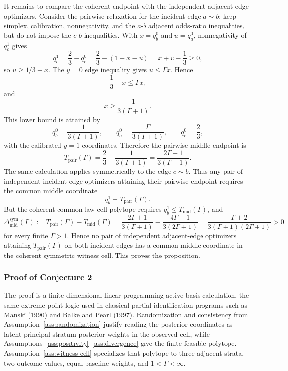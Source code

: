 \documentclass[11pt]{article}
\theoremstyle{definition}
\theoremstyle{plain}
\theoremstyle{remark}
\begin{document}
It remains to compare the coherent endpoint with the independent adjacent-edge optimizers.  Consider the pairwise relaxation for the incident edge \(a\sim b\): keep simplex, calibration, nonnegativity, and the \(a\)-\(b\) adjacent odds-ratio inequalities, but do not impose the \(c\)-\(b\) inequalities.  With \(x=q_b^0\) and \(u=q_a^0\), nonnegativity of \(q_c^1\) gives
\[
  q_c^1=\frac23-q_c^0
  =\frac23-(1-x-u)
  =x+u-\frac13\ge 0,
\]
so \(u\ge 1/3-x\).  The \(y=0\) edge inequality gives \(u\le \Gamma x\).  Hence
\[
  \frac13-x\le \Gamma x,
\]
and
\[
  x\ge \frac{1}{3(\Gamma+1)}.
\]
This lower bound is attained by
\[
  q_b^0=\frac{1}{3(\Gamma+1)},\qquad
  q_a^0=\frac{\Gamma}{3(\Gamma+1)},\qquad
  q_c^0=\frac23,
\]
with the calibrated \(y=1\) coordinates.  Therefore the pairwise middle endpoint is
\[
  T_{\mathrm{pair}}(\Gamma)
  =
  \frac23-\frac{1}{3(\Gamma+1)}
  =
  \frac{2\Gamma+1}{3(\Gamma+1)}.
\]
The same calculation applies symmetrically to the edge \(c\sim b\).  Thus any pair of independent incident-edge optimizers attaining their pairwise endpoint requires the common middle coordinate
\[
  q_b^1=T_{\mathrm{pair}}(\Gamma).
\]
But the coherent common-law cell polytope requires \(q_b^1\le T_{\mathrm{mid}}(\Gamma)\), and
\[
  \Delta_{\mathrm{mid}}^{\mathrm{sym}}(\Gamma)
  :=
  T_{\mathrm{pair}}(\Gamma)-T_{\mathrm{mid}}(\Gamma)
  =
  \frac{2\Gamma+1}{3(\Gamma+1)}
  -\frac{4\Gamma-1}{3(2\Gamma+1)}
  =
  \frac{\Gamma+2}{3(\Gamma+1)(2\Gamma+1)}
  >0
\]
for every finite \(\Gamma>1\).  Hence no pair of independent adjacent-edge optimizers attaining \(T_{\mathrm{pair}}(\Gamma)\) on both incident edges has a common middle coordinate in the coherent symmetric witness cell.  This proves the proposition.

\subsubsection*{Proof of Conjecture 2}
The proof is a finite-dimensional linear-programming active-basis calculation, the same extreme-point logic used in classical partial-identification programs such as Manski (1990) and Balke and Pearl (1997).  Randomization and consistency from Assumption~\ref{ass:randomization} justify reading the posterior coordinates as latent principal-stratum posterior weights in the observed cell, while Assumptions~\ref{ass:positivity}--\ref{ass:divergence} give the finite feasible polytope.  Assumption~\ref{ass:witness-cell} specializes that polytope to three adjacent strata, two outcome values, equal baseline weights, and \(1<\Gamma<\infty\).
\end{document}
